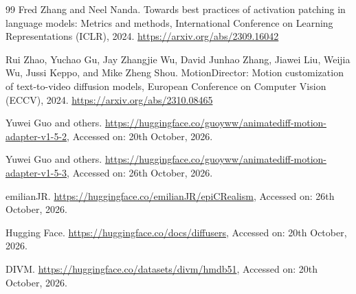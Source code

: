 \documentclass[twoside,english]{article}
\begin{document}
\begin{thebibliography}{99}
 Fred Zhang and Neel Nanda. Towards best practices of activation patching in language models: Metrics and methods, International Conference on Learning Representations (ICLR), 2024. \url{https://arxiv.org/abs/2309.16042}

 Rui Zhao, Yuchao Gu, Jay Zhangjie Wu, David Junhao Zhang, Jiawei Liu, Weijia Wu, Jussi Keppo, and Mike Zheng Shou. MotionDirector: Motion customization of text-to-video diffusion models, European Conference on Computer Vision (ECCV), 2024. \url{https://arxiv.org/abs/2310.08465}

 Yuwei Guo and others. \url{https://huggingface.co/guoyww/animatediff-motion-adapter-v1-5-2}, Accessed on: 20th October, 2026.

 Yuwei Guo and others. \url{https://huggingface.co/guoyww/animatediff-motion-adapter-v1-5-3}, Accessed on: 26th October, 2026.

 emilianJR. \url{https://huggingface.co/emilianJR/epiCRealism}, Accessed on: 26th October, 2026.

 Hugging Face. \url{https://huggingface.co/docs/diffusers}, Accessed on: 20th October, 2026.

 DIVM. \url{https://huggingface.co/datasets/divm/hmdb51}, Accessed on: 20th October, 2026.

\end{thebibliography}
\end{document}
